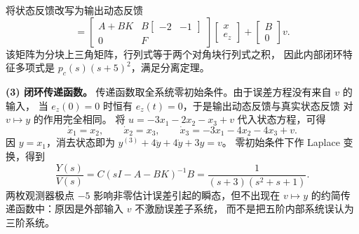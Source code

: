 \documentclass[11pt]{article}
\begin{document}
\begin{solution}
\begin{proofstep}{将状态反馈改写为输出动态反馈}
\[ =\begin{bmatrix}A+BK&B\begin{bmatrix}-2&-1\end{bmatrix}\\0&F\end{bmatrix}
 \begin{bmatrix}x\\e_z\end{bmatrix}
 +\begin{bmatrix}B\\0\end{bmatrix}v.
\]
该矩阵为分块上三角矩阵，行列式等于两个对角块行列式之积，
因此内部闭环特征多项式是 $p_c(s)(s+5)^2$，满足分离定理。
\end{proofstep}

\medskip\textbf{(3) 闭环传递函数。}
传递函数取全系统零初始条件。由于误差方程没有来自 $v$ 的输入，
当 $e_z(0)=0$ 时恒有 $e_z(t)=0$，于是输出动态反馈与真实状态反馈
对 $v\mapsto y$ 的作用完全相同。
将 $u=-3x_1-2x_2-x_3+v$ 代入状态方程，可得
\[
 \dot x_1=x_2,\qquad \dot x_2=x_3,\qquad
 \dot x_3=-3x_1-4x_2-4x_3+v.
\]
因 $y=x_1$，消去状态即为 $y^{(3)}+4\ddot y+4\dot y+3y=v$。
零初始条件下作 Laplace 变换，得到
\[
 \boxed{\frac{Y(s)}{V(s)}=C(sI-A-BK)^{-1}B
 =\frac1{(s+3)(s^2+s+1)}.}
\]
两枚观测器极点 $-5$ 影响非零估计误差引起的瞬态，但不出现在
$v\mapsto y$ 的约简传递函数中：原因是外部输入 $v$ 不激励误差子系统，
而不是把五阶内部系统误认为三阶系统。
\end{solution}
\end{document}

